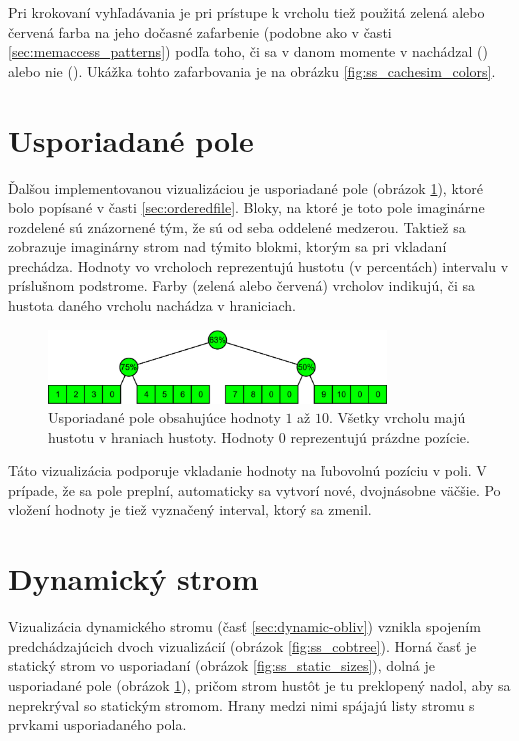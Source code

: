 Pri krokovaní vyhľadávania je pri prístupe k vrcholu tiež použitá zelená alebo červená farba na jeho dočasné zafarbenie (podobne ako v časti \ref{sec:memaccess_patterns}) podľa toho, či sa v danom momente v \cache nachádzal (\hit) alebo nie (\miss). Ukážka tohto zafarbovania je na obrázku \ref{fig:ss_cachesim_colors}.

\section{Usporiadané pole}
Ďalšou implementovanou vizualizáciou je usporiadané pole (obrázok \ref{fig:ss_of_overview}), ktoré bolo popísané v časti \ref{sec:orderedfile}. Bloky, na ktoré je toto pole imaginárne rozdelené sú znázornené tým, že sú od seba oddelené medzerou. Taktiež sa zobrazuje imaginárny strom nad týmito blokmi, ktorým sa pri vkladaní prechádza. Hodnoty vo vrcholoch reprezentujú hustotu (v percentách) intervalu v príslušnom podstrome. Farby (zelená alebo červená) vrcholov indikujú, či sa hustota daného vrcholu nachádza v hraniciach.

\begin{figure}
    \centering
    \includegraphics[width=0.8\textwidth]{figures/screenshots/of_overview_3.pdf}
    \caption{Usporiadané pole obsahujúce hodnoty $1$ až $10$. Všetky vrcholu majú hustotu v hraniach hustoty. Hodnoty $0$ reprezentujú prázdne pozície.}
    \label{fig:ss_of_overview}
\end{figure}

Táto vizualizácia podporuje vkladanie hodnoty na ľubovolnú pozíciu v poli. V prípade, že sa pole preplní, automaticky sa vytvorí nové, dvojnásobne väčšie. Po vložení hodnoty je tiež vyznačený interval, ktorý sa zmenil.

\section{Dynamický strom}
Vizualizácia dynamického stromu (časť \ref{sec:dynamic-obliv}) vznikla spojením predchádzajúcich dvoch vizualizácií (obrázok \ref{fig:ss_cobtree}). Horná časť je statický strom vo \vEB usporiadaní (obrázok \ref{fig:ss_static_sizes}), dolná je usporiadané pole (obrázok \ref{fig:ss_of_overview}), pričom strom hustôt je tu preklopený nadol, aby sa neprekrýval so statickým stromom. Hrany medzi nimi spájajú listy stromu s prvkami usporiadaného pola. 

